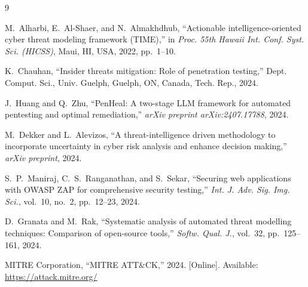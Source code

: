 \documentclass[12pt, a4paper]{article}
\begin{document}
\begin{thebibliography}{9}

M.~Alharbi, E.~Al-Shaer, and N.~Almakhdhub, ``Actionable intelligence-oriented cyber threat modeling framework (TIME),'' in \textit{Proc. 55th Hawaii Int. Conf. Syst. Sci. (HICSS)}, Maui, HI, USA, 2022, pp.~1--10.

K.~Chauhan, ``Insider threats mitigation: Role of penetration testing,'' Dept. Comput. Sci., Univ. Guelph, Guelph, ON, Canada, Tech. Rep., 2024.

J.~Huang and Q.~Zhu, ``PenHeal: A two-stage LLM framework for automated pentesting and optimal remediation,'' \textit{arXiv preprint arXiv:2407.17788}, 2024.

M.~Dekker and L.~Alevizos, ``A threat-intelligence driven methodology to incorporate uncertainty in cyber risk analysis and enhance decision making,'' \textit{arXiv preprint}, 2024.

S.~P.~Maniraj, C.~S.~Ranganathan, and S.~Sekar, ``Securing web applications with OWASP ZAP for comprehensive security testing,'' \textit{Int. J. Adv. Sig. Img. Sci.}, vol.~10, no.~2, pp.~12--23, 2024.

D.~Granata and M.~Rak, ``Systematic analysis of automated threat modelling techniques: Comparison of open-source tools,'' \textit{Softw. Qual. J.}, vol.~32, pp.~125--161, 2024.

MITRE Corporation, ``MITRE ATT\&CK,'' 2024. [Online]. Available: \url{https://attack.mitre.org/}

\end{thebibliography}
\end{document}
